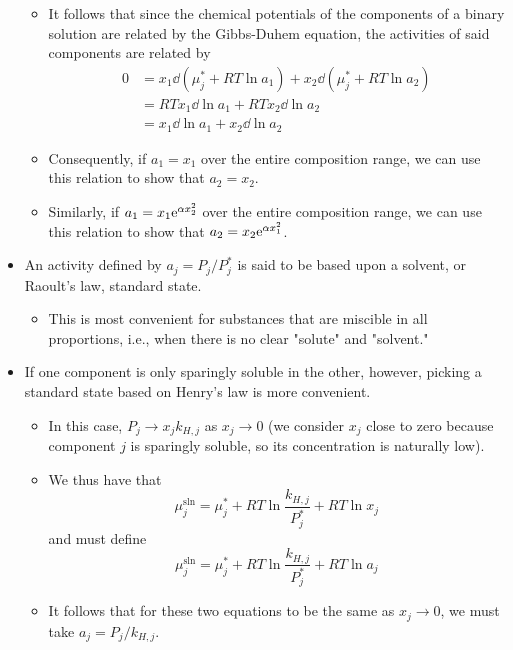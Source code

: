 \documentclass[../notes.tex]{subfiles}
\begin{document}
\begin{itemize}
\begin{itemize}
        \item It follows that since the chemical potentials of the components of a binary solution are related by the Gibbs-Duhem equation, the activities of said components are related by
        \begin{align*}
            0 &= x_1\dd{(\mu_j^*+RT\ln a_1)}+x_2\dd{(\mu_j^*+RT\ln a_2)}\\
            &= RTx_1\dd{\ln a_1}+RTx_2\dd{\ln a_2}\\
            &= x_1\dd{\ln a_1}+x_2\dd{\ln a_2}
        \end{align*}
        \item Consequently, if $a_1=x_1$ over the entire composition range, we can use this relation to show that $a_2=x_2$.
        \item Similarly, if $a_1=x_1\e[\alpha x_2^2]$ over the entire composition range, we can use this relation to show that $a_2=x_2\e[\alpha x_1^2]$.
    \end{itemize}
    \item An activity defined by $a_j=P_j/P_j^*$ is said to be based upon a solvent, or Raoult's law, standard state.
    \begin{itemize}
        \item This is most convenient for substances that are miscible in all proportions, i.e., when there is no clear "solute" and "solvent."
    \end{itemize}
    \item If one component is only sparingly soluble in the other, however, picking a standard state based on Henry's law is more convenient.
    \begin{itemize}
        \item In this case, $P_j\to x_jk_{H,j}$ as $x_j\to 0$ (we consider $x_j$ close to zero because component $j$ is sparingly soluble, so its concentration is naturally low).
        \item We thus have that
        \begin{equation*}
            \mu_j^\text{sln} = \mu_j^*+RT\ln\frac{k_{H,j}}{P_j^*}+RT\ln x_j
        \end{equation*}
        and must define
        \begin{equation*}
            \mu_j^\text{sln} = \mu_j^*+RT\ln\frac{k_{H,j}}{P_j^*}+RT\ln a_j
        \end{equation*}
        \item It follows that for these two equations to be the same as $x_j\to 0$, we must take $a_j=P_j/k_{H,j}$.

\end{itemize}
\end{itemize}
\end{document}
